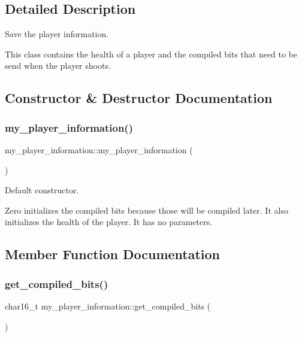\subsection{Detailed Description}
Save the player information. 

This class contains the health of a player and the compiled bits that need to be send when the player shoots. 

\subsection{Constructor \& Destructor Documentation}
\hypertarget{classmy__player__information_a32ffeb6d9e2850542685e4fb40e28f9a}{}\label{classmy__player__information_a32ffeb6d9e2850542685e4fb40e28f9a} 
\subsubsection{\texorpdfstring{my\+\_\+player\+\_\+information()}{my\_player\_information()}}
{\footnotesize\ttfamily my\+\_\+player\+\_\+information\+::my\+\_\+player\+\_\+information (\begin{DoxyParamCaption}{ }\end{DoxyParamCaption})\hspace{0.3cm}{\ttfamily [inline]}}



Default constructor. 

Zero initializes the compiled bits because those will be compiled later. It also initializes the health of the player. It has no parameters. 

\subsection{Member Function Documentation}
\hypertarget{classmy__player__information_a065c0e06903f41d5ecfcadbf7bd0bb12}{}\label{classmy__player__information_a065c0e06903f41d5ecfcadbf7bd0bb12} 
\subsubsection{\texorpdfstring{get\+\_\+compiled\+\_\+bits()}{get\_compiled\_bits()}}
{\footnotesize\ttfamily char16\+\_\+t my\+\_\+player\+\_\+information\+::get\+\_\+compiled\+\_\+bits (\begin{DoxyParamCaption}{ }\end{DoxyParamCaption})\hspace{0.3cm}{\ttfamily [inline]}}



